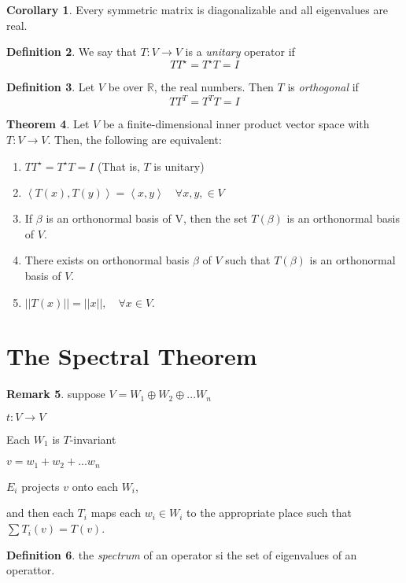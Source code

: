 \documentclass[a5paper]{article}
\theoremstyle{definition}%
\newtheorem{theorem}{Theorem}
\numberwithin{theorem}{section} %
\newtheorem{corollary}[theorem]{Corollary}
\newtheorem{definition}[theorem]{Definition}
\newtheorem{remark}[theorem]{Remark}
\newcommand{\R}{\mathbb{R}}
\newcommand{\inner}[1]{\left< #1 \right>}
\begin{document}
\begin{corollary}
Every symmetric matrix is diagonalizable and all eigenvalues are real. 
\end{corollary}

\begin{definition}
We say that $T:V \to V$ is a \emph{unitary} operator if 
$$TT^\star = T^\star T=I$$
\end{definition}

\begin{definition}
Let $V$ be over $\R$, the real numbers. Then $T$ is \emph{orthogonal} if
$$TT^T = T^T T=I$$
\end{definition}

\begin{theorem}
Let $V$ be a finite-dimensional inner product vector space with $T:V \to V$. Then, the following are equivalent:
\begin{enumerate}
\item $TT^\star = T^\star T=I$ (That is, $T$ is unitary)
\item $\inner{T(x), T(y)} = \inner{x,y} \quad \forall x,y, \in V$
\item If $\beta$ is an orthonormal basis of V, then the set $T(\beta)$ is an orthonormal basis of $V$. 
\item There exists on orthonormal basis $\beta$ of $V$ such that $T(\beta)$ is an orthonormal basis of $V$. 
\item $||T(x)||=||x||, \quad \forall x \in V$. 
\end{enumerate}
\end{theorem}

\section{The Spectral Theorem}

\begin{remark}
suppose $V = W_1 \oplus W_2 \oplus ... W_n$

$t:V \to V$

Each $W_1$ is $T$-invariant

$v=w_1+w_2+...w_n$

$E_i$ projects $v$ onto each $W_i$, 

and then each $T_i$ maps each $w_i \in W_i$ to the appropriate place such that $\sum T_i(v) = T(v)$.

\end{remark}

\begin{definition}
the \emph{spectrum} of an operator si the set of eigenvalues of an operattor. 
\end{definition}
\end{document}
